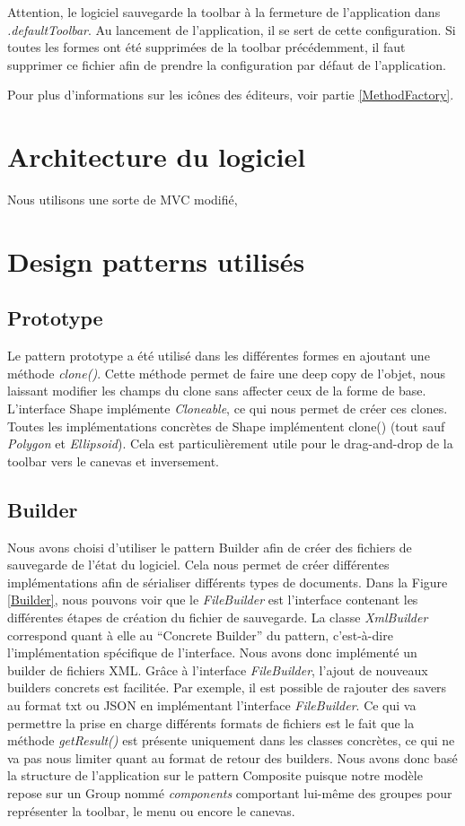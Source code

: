 \documentclass{article}
\begin{document}
Attention, le logiciel sauvegarde la toolbar à la fermeture de l'application dans \textit{.defaultToolbar}. Au lancement de l'application, il se sert de cette configuration.
Si toutes les formes ont été supprimées de la toolbar précédemment, il faut supprimer ce fichier afin de prendre la configuration par défaut de l'application.

Pour plus d'informations sur les icônes des éditeurs, voir partie \ref{MethodFactory}.


\section{Architecture du logiciel}

Nous utilisons une sorte de MVC modifié,


\section{Design patterns utilisés} \label{sec2}

\subsection{Prototype}
Le pattern prototype a été utilisé dans les différentes formes en ajoutant une méthode \textit{clone()}. Cette méthode permet de faire une deep copy de l'objet,
 nous laissant modifier les champs du clone sans affecter ceux de la forme de base.
 L'interface Shape implémente \textit{Cloneable}, ce qui nous permet de créer ces clones.
 Toutes les implémentations concrètes de Shape implémentent clone() (tout sauf \textit{Polygon} et \textit{Ellipsoid}).
 Cela est particulièrement utile pour le drag-and-drop de la toolbar vers le canevas et inversement.

\subsection{Builder}
Nous avons choisi d'utiliser le pattern Builder afin de créer des fichiers de sauvegarde de l'état du logiciel. Cela nous permet de créer différentes implémentations
afin de sérialiser différents types de documents. Dans la Figure \ref{Builder}, nous pouvons voir que le \textit{FileBuilder} est l'interface contenant les différentes étapes de création
du fichier de sauvegarde. La classe \textit{XmlBuilder} correspond quant à elle au ``Concrete Builder'' du pattern, c'est-à-dire l'implémentation spécifique
de l'interface. Nous avons donc implémenté un builder de fichiers XML. Grâce à l'interface \textit{FileBuilder}, l'ajout de nouveaux builders concrets est facilitée.
Par exemple, il est possible de rajouter des savers au format txt ou JSON en implémentant l'interface \textit{FileBuilder}.
Ce qui va permettre la prise en charge différents formats de fichiers est le fait que la méthode \textit{getResult()} est présente uniquement dans les classes concrètes, ce qui ne va pas nous
limiter quant au format de retour des builders. Nous avons donc basé la structure de l'application sur le pattern Composite puisque notre modèle repose sur un Group nommé \textit{components}
comportant lui-même des groupes pour représenter la toolbar, le menu ou encore le canevas.
\end{document}
